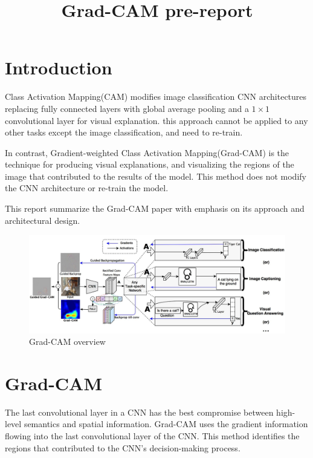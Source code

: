 \documentclass[extendedabs]{bmvc2k}
\begin{document}
\title{Grad-CAM pre-report}

 

\maketitle
\noindent

\section{Introduction}
Class Activation Mapping(CAM)\cite{cam} modifies image classification CNN architectures replacing fully connected layers with global average pooling and a $1\times1$ convolutional layer for visual explanation. this approach cannot be applied to any other tasks except the image classification, and need to re-train. 
 
In contrast, Gradient-weighted Class Activation Mapping(Grad-CAM)\cite{gradcam} is the technique for producing visual explanations, and visualizing the regions of the image that contributed to the results of the model. This method does not modify the CNN architecture or re-train the model.

This report summarize the Grad-CAM paper\cite{gradcam} with emphasis on its approach and architectural design.

\begin{figure}[t]
\centering
	\includegraphics[width=\linewidth]{images/fig1.PNG}
	\caption{
		Grad-CAM overview}
	\vspace{-2mm}
        \label{fig:gradcamoverview}
\end{figure}

\section{Grad-CAM}
The last convolutional layer in a CNN has the best compromise between high-level semantics and spatial information. Grad-CAM uses the gradient information flowing into the last convolutional layer of the CNN. 
This method identifies the regions that contributed to the CNN's decision-making process.
\end{document}
